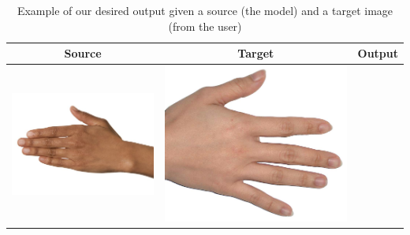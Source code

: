 \begin{table}[H]
	\centering
	\caption{Example of our desired output given a source (the model) and a target image (from the user) \label{tab:our_demo}}	
\begin{tabular}{|c|c|c|}
	\hline
	Source & Target & Output \\ 
	\hline
	  \begin{minipage}{.29\textwidth}
	    \includegraphics[width=\textwidth,height=\textheight,keepaspectratio]{../inputs/hand_brown.jpg}
	  \end{minipage} & 
	  \begin{minipage}{.29\textwidth}
	    \includegraphics[width=\textwidth,height=\textheight,keepaspectratio]{../inputs/hand_light.jpg}

\end{minipage}
\end{tabular}
\end{table}

